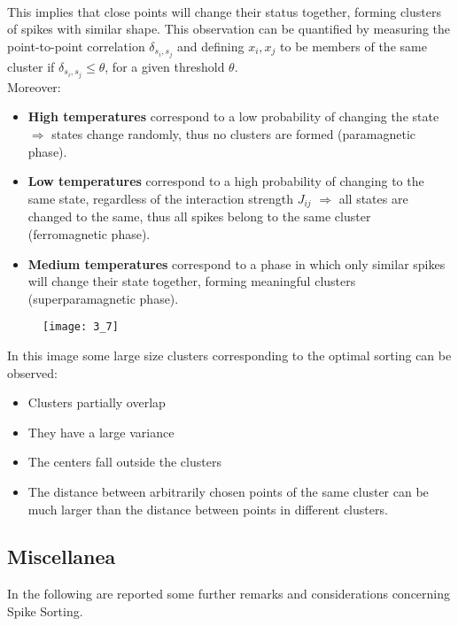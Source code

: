 \begin{itemize}
\begin{align*}
          \end{align*}
          This implies that close points will change their status together, forming
          clusters of spikes with similar shape. This observation can be quantified by
          measuring the point-to-point correlation \(\delta_{s_i,s_j}\) and defining
          \(x_i,x_j\) to be members of the same cluster if
          \(\delta_{s_i,s_j}\leq\theta\), for a given threshold \(\theta\).\\
          Moreover:
          \begin{itemize}
              \item \textbf{High temperatures} correspond to a low probability of changing
                    the state \(\Rightarrow\) states change randomly, thus no clusters
                    are formed (paramagnetic phase).
              \item \textbf{Low temperatures} correspond to a high probability of changing
                    to the same state, regardless of the interaction strength \(J_{ij}\)
                    \(\Rightarrow\) all states are changed to the same, thus all spikes
                    belong to the same cluster (ferromagnetic phase).
              \item \textbf{Medium temperatures} correspond to a phase in which only similar
                    spikes will change their state together, forming meaningful clusters
                    (superparamagnetic phase).
          \end{itemize}
\end{itemize}
\begin{figure}[H]
    \texttt{[image: 3\_7]}
    \centering
\end{figure}
In this image some large size clusters corresponding to the optimal sorting can be
observed:
\begin{itemize}
    \item Clusters partially overlap
    \item They have a large variance
    \item The centers fall outside the clusters
    \item The distance between arbitrarily chosen points of the same cluster can
          be much larger than the distance between points in different clusters.
\end{itemize}

\subsection{Miscellanea}
In the following are reported some further remarks and considerations concerning
Spike Sorting.
